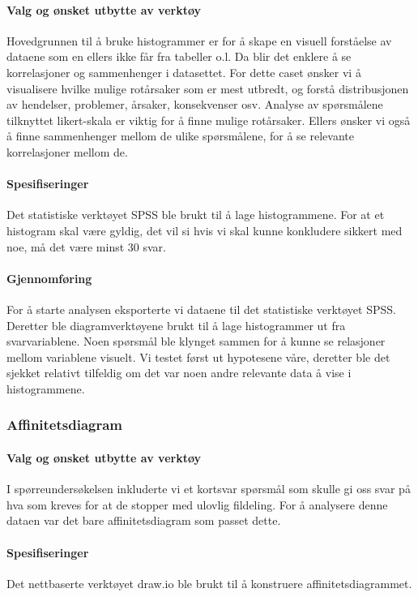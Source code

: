 \paragraph{Valg og ønsket utbytte av verktøy}
Hovedgrunnen til å bruke histogrammer er for å skape en visuell forståelse av dataene som en ellers ikke får fra tabeller o.l. Da blir det enklere å se korrelasjoner og sammenhenger i datasettet. For dette caset ønsker vi å visualisere hvilke mulige rotårsaker som er mest utbredt, og forstå distribusjonen av hendelser, problemer, årsaker, konsekvenser osv. Analyse av spørsmålene tilknyttet likert-skala er viktig for å finne mulige rotårsaker. Ellers ønsker vi også å finne sammenhenger mellom de ulike spørsmålene, for å se relevante korrelasjoner mellom de.

\paragraph{Spesifiseringer}
Det statistiske verktøyet SPSS ble brukt til å lage histogrammene. For at et histogram skal være gyldig, det vil si hvis vi skal kunne konkludere sikkert med noe, må det være minst 30 svar. 

\paragraph{Gjennomføring}
For å starte analysen eksporterte vi dataene til det statistiske verktøyet SPSS. Deretter ble diagramverktøyene brukt til å lage histogrammer ut fra svarvariablene. Noen spørsmål ble klynget sammen for å kunne se relasjoner mellom variablene visuelt. Vi testet først ut hypotesene våre, deretter ble det sjekket relativt tilfeldig om det var noen andre relevante data å vise i histogrammene. 


\subsubsection{Affinitetsdiagram}

\paragraph{Valg og ønsket utbytte av verktøy}
I spørreundersøkelsen inkluderte vi et kortsvar spørsmål som skulle gi oss svar på hva som kreves for at de stopper med ulovlig fildeling. For å analysere denne dataen var det bare affinitetsdiagram som passet dette. 

\paragraph{Spesifiseringer}
Det nettbaserte verktøyet draw.io ble brukt til å konstruere affinitetsdiagrammet. 

